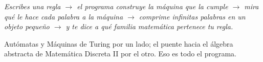 \documentclass[11pt,a4paper]{article}
\begin{document}
\begin{center}
\begin{minipage}{0.92\linewidth}\itshape\large\color{accent}
Escribes una regla $\to$ el programa construye la máquina que la cumple $\to$
mira qué le hace cada palabra a la máquina $\to$ comprime infinitas palabras en
un objeto pequeño $\to$ y te dice a qué familia matemática pertenece tu regla.
\end{minipage}
\end{center}

\vfill
\begin{center}\small\color{gray}
Autómatas y Máquinas de Turing por un lado; el puente hacia el álgebra abstracta
de Matemática Discreta II por el otro. Eso es todo el programa.
\end{center}
\end{document}
